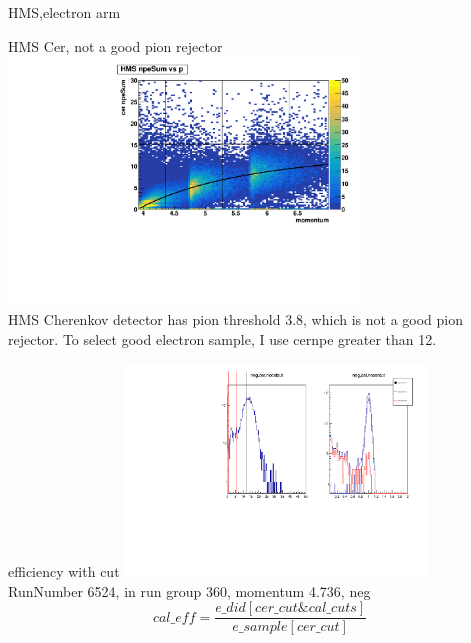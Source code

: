 \documentclass[aspectratio=169,xcolor=dvipsnames]{beamer}
\begin{document}
\begin{frame}{HMS,electron arm}
\end{frame}{}
\begin{frame}{HMS Cer, not a good pion rejector}
  \includegraphics[width = 0.7\textwidth]{results/pid/all_npeSum_p_32.pdf}
\\
HMS Cherenkov detector has pion threshold 3.8, which is not a good pion rejector. To select good electron sample, I use cernpe greater than 12.  
\end{frame}
\begin{frame}{efficiency with cut}
  \includegraphics[width = 0.6\textwidth]{results/pid/cal_DE_6524.pdf}
  \\
  RunNumber 6524, in run group 360, momentum 4.736, neg
  \\
  $$cal\_eff = \frac{e\_did[cer\_cut \& cal\_cuts]}{e\_sample[cer\_cut]}$$
\end{frame}
\end{document}
